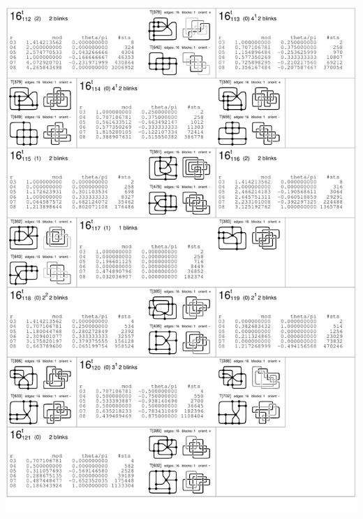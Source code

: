 \begin{center}
 \includegraphics[height=23.5cm]{E.figsbw2/con3catalog026_bw.pdf} \eject

\end{center}
